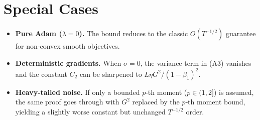 \documentclass[11pt]{article}
\begin{document}
\section*{Special Cases}
\begin{itemize}[leftmargin=*]
\item \textbf{Pure Adam ($\lambda=0$).} The bound reduces to the classic
  $O(T^{-1/2})$ guarantee for non‑convex smooth objectives.
\item \textbf{Deterministic gradients.} When $\sigma=0$, the variance term in (A3)
  vanishes and the constant $C_{2}$ can be sharpened to $L\eta G^{2}/(1-\beta_{1})^{2}$.
\item \textbf{Heavy‑tailed noise.} If only a bounded $p$‑th moment ($p\in(1,2]$) is
  assumed, the same proof goes through with $G^{2}$ replaced by the $p$‑th moment
  bound, yielding a slightly worse constant but unchanged $T^{-1/2}$ order.
\end{itemize}

\end{document}
